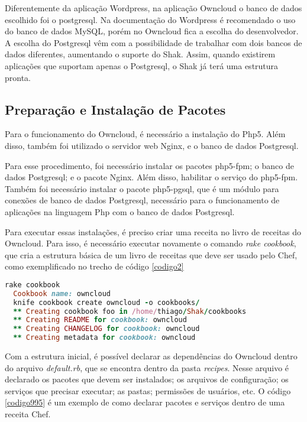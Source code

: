 Diferentemente da aplicação Wordpress, na aplicação Owncloud o 
banco de dados escolhido foi o postgresql. Na documentação do Wordpress é recomendado
o uso do banco de dados MySQL, porém no Owncloud fica a escolha do desenvolvedor.
A escolha do Postgresql vêm com a possibilidade de trabalhar com dois bancos de
dados diferentes, aumentando o suporte do Shak. Assim, quando existirem aplicações
que suportam apenas o Postgresql, o Shak já terá uma estrutura pronta.

\subsection{Preparação e Instalação de Pacotes}

Para o funcionamento do Owncloud, é necessário a instalação do Php5. Além
disso, também foi utilizado o servidor web Nginx, e o 
banco de dados Postgresql.

Para esse procedimento, foi necessário instalar os pacotes php5-fpm; o banco
de dados Postgresql; e o pacote Nginx. Além disso, habilitar o serviço do php5-fpm. 
Também foi necessário instalar o pacote php5-pgsql, que é um módulo para
conexões de banco de dados Postgresql, necessário para o funcionamento de
aplicações na linguagem Php com o banco de dados Postgresql.

Para executar essas instalações, é preciso criar uma receita no livro de receitas
do Owncloud. Para isso, é necessário executar novamente o comando \textit{rake cookbook}, 
que cria a estrutura básica de um livro de receitas que deve ser usado pelo Chef, 
como exemplificado no trecho de código \ref{codigo2}

\begin{lstlisting}[language=Ruby,label=dice_index,caption={Exemplo de criação de estrutura básica de livro de receitas do Owncloud com Shak}, label=codigo2]
  rake cookbook
  Cookbook name: owncloud
  knife cookbook create owncloud -o cookbooks/
  ** Creating cookbook foo in /home/thiago/Shak/cookbooks
  ** Creating README for cookbook: owncloud
  ** Creating CHANGELOG for cookbook: owncloud
  ** Creating metadata for cookbook: owncloud
\end{lstlisting}

Com a estrutura inicial, é possível declarar as dependências do Owncloud
dentro do arquivo \textit{default.rb}, que se encontra dentro da pasta 
\textit{recipes}. Nesse arquivo é 
declarado os pacotes que devem ser instalados; os arquivos de configuração;
os serviços que precisar executar; as pastas; permissões de usuários, etc. O código
\ref{codigo995} é um exemplo
de como declarar pacotes e serviços dentro de uma receita Chef.


